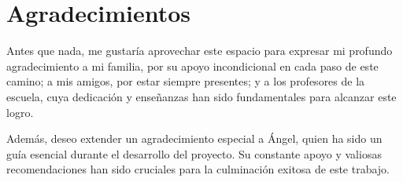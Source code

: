 \chapter*{Agradecimientos}
\thispagestyle{empty}

\vspace{1cm}

Antes que nada, me gustaría aprovechar este espacio para expresar mi profundo agradecimiento a mi familia, por su apoyo incondicional en cada paso de este camino; a mis amigos, por estar siempre presentes; y a los profesores de la escuela, cuya dedicación y enseñanzas han sido fundamentales para alcanzar este logro.

Además, deseo extender un agradecimiento especial a Ángel, quien ha sido un guía esencial durante el desarrollo del proyecto. Su constante apoyo y valiosas recomendaciones han sido cruciales para la culminación exitosa de este trabajo.